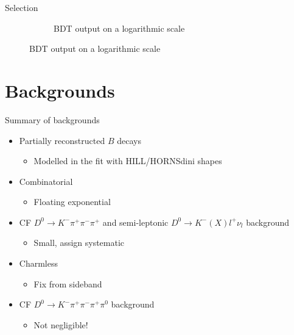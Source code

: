 \documentclass{beamer}
\begin{document}
\begin{frame}{Selection}
\begin{figure}
\begin{subfigure}{0.5\textwidth}
      \caption{BDT output on a logarithmic scale}
    \end{subfigure}
  \end{figure}
\end{frame}

\section{Backgrounds}

\begin{frame}{Summary of backgrounds}
  \begin{itemize}
    \item{Partially reconstructed $B$ decays}
    \begin{itemize}
      \item{Modelled in the fit with HILL/HORNSdini shapes}
    \end{itemize}
    \item{Combinatorial}
    \begin{itemize}
      \item{Floating exponential}
    \end{itemize}
    \item{CF $D^0\to K^-\pi^+\pi^-\pi^+$ and semi-leptonic $D^0\to K^-(X)l^+\nu_l$ background}
    \begin{itemize}
      \item{Small, assign systematic}
    \end{itemize}
    \item{Charmless}
    \begin{itemize}
      \item{Fix from sideband}
    \end{itemize}
    \item{CF $D^0\to K^-\pi^+\pi^-\pi^+\pi^0$ background}
    \begin{itemize}
      \item{Not negligible!}
    \end{itemize}
  \end{itemize}
\end{frame}
\end{document}
